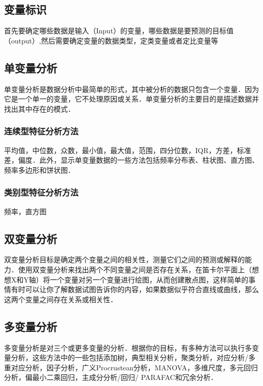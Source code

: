 \subsection{变量标识}
首先要确定哪些数据是输入（Input）的变量，哪些数据是要预测的目标值（output）,然后需要确定变量的数据类型，定类变量或者定比变量等
\subsection{单变量分析}
单变量分析是数据分析中最简单的形式，其中被分析的数据只包含一个变量．因为它是一个单一的变量，它不处理原因或关系．单变量分析的主要目的是描述数据并找出其中存在的模式．  
\subsubsection{连续型特征分析方法}
平均值，中位数，众数，最小值，最大值，范围，四分位数，IQR，方差，标准差，偏度．此外，显示单变量数据的一些方法包括频率分布表、柱状图、直方图、频率多边形和饼状图．
\subsubsection{类别型特征分析方法}
频率，直方图
\subsection{双变量分析}
双变量分析目标是确定两个变量之间的相关性，测量它们之间的预测或解释的能力．使用双变量分析来找出两个不同变量之间是否存在关系，在笛卡尔平面上（想想X和Y轴）将一个变量对另一个变量进行绘图，从而创建散点图，这样简单的事情有时可以让你了解数据试图告诉你的内容，如果数据似乎符合直线或曲线，那么这两个变量之间存在关系或相关性．
\subsection{多变量分析}
多变量分析是对三个或更多变量的分析．根据你的目标，有多种方法可以执行多变量分析，这些方法中的一些包括添加树，典型相关分析，聚类分析，对应分析/多重对应分析，因子分析，广义Procrustean分析，MANOVA，多维尺度，多元回归分析，偏最小二乘回归，主成分分析/回归/ PARAFAC和冗余分析．

